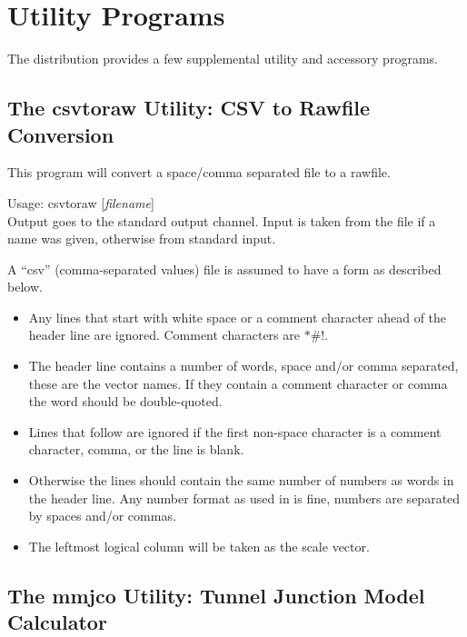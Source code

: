 
\chapter{Utility Programs}


The {\WRspice} distribution provides a few supplemental utility
and accessory programs.

\section{The {\vt csvtoraw} Utility: CSV to Rawfile Conversion}


This program will convert a space/comma separated file to a rawfile.

Usage:  {\vt csvtoraw} [{\it filename\/}]\\
Output goes to the standard output channel.  Input is taken from the
file if a name was given, otherwise from standard input.

A ``csv'' (comma-separated values) file is assumed to have a form as
described below.
\begin{itemize}
\item{Any lines that start with white space or a comment character
ahead of the header line are ignored.  Comment characters are $*\#!$.}
\item{The header line contains a number of words, space and/or comma
separated, these are the vector names.  If they contain a comment
character or comma the word should be double-quoted.}
\item{Lines that follow are ignored if the first non-space character is
a comment character, comma, or the line is blank.}
\item{Otherwise the lines should contain the same number of numbers as
words in the header line.  Any number format as used in {\WRspice}
is fine, numbers are separated by spaces and/or commas.}
\item{The leftmost logical column will be taken as the scale vector.}
\end{itemize}

\section{The {\vt mmjco} Utility: Tunnel Junction Model Calculator}
\label{mmjco}

